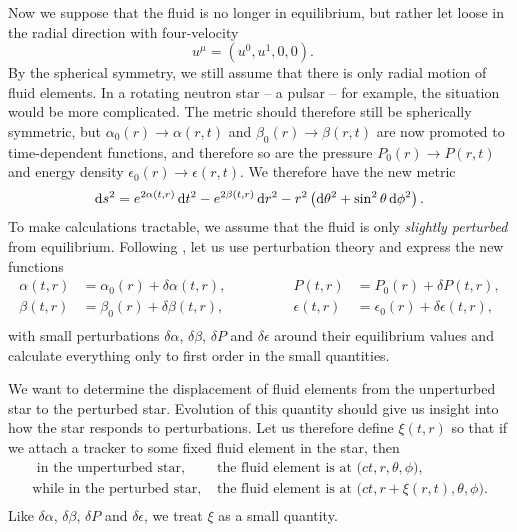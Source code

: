 Now we suppose that the fluid is no longer in equilibrium, but rather let loose in the radial direction with four-velocity
\begin{equation}
	u^\mu = (u^0, u^1, 0, 0) .
	\quad
\label{eq:nstars:velocity_unstable}
\end{equation}
By the spherical symmetry, we still assume that there is only radial motion of fluid elements.
In a rotating neutron star -- a pulsar -- for example, the situation would be more complicated.
The metric should therefore still be spherically symmetric, but $\alpha_0(r) \rightarrow \alpha(r,t)$ and $\beta_0(r) \rightarrow \beta(r,t)$ are now promoted to time-dependent functions, and therefore so are the pressure $P_0(r) \rightarrow P(r,t)$ and energy density $\epsilon_0(r) \rightarrow \epsilon(r,t)$.
We therefore have the new metric
\begin{equation}
	\mathop{}\!\mathrm{d} s^2 = e^{2 \alpha(t, r)} \mathop{}\!\mathrm{d} t^2 - e^{2 \beta(t, r)} \mathop{}\!\mathrm{d} r^2 - r^2 \left( \mathop{}\!\mathrm{d} \theta^2 + \sin^2 \theta \mathop{}\!\mathrm{d} \phi^2 \right) .
\label{eq:nstars:metric_unstable}
\end{equation}
To make calculations tractable, we assume that the fluid is only \emph{slightly perturbed} from equilibrium.
Following \cite{ref:chandrasekhar_stability}, let us use perturbation theory and express the new functions
\begin{equation}
\begin{aligned}
	\alpha   (t, r) &= \alpha_0  (r) + \delta \alpha  (t, r), & \qquad \qquad
	P        (t, r) &= P_0       (r) + \delta P       (t, r), \\
	\beta    (t, r) &= \beta_0   (r) + \delta \beta   (t, r), & \qquad \qquad
	\epsilon (t, r) &= \epsilon_0(r) + \delta \epsilon(t, r), \\
\end{aligned}
\label{eq:nstars:perturbation_expansion}
\end{equation}
with small perturbations $\delta \alpha$, $\delta \beta$, $\delta P$ and $\delta \epsilon$ around their equilibrium values and calculate everything only to first order in the small quantities.

We want to determine the displacement of fluid elements from the unperturbed star to the perturbed star.
Evolution of this quantity should give us insight into how the star responds to perturbations.
Let us therefore define $\xi(t, r)$ so that if we attach a tracker to some fixed fluid element in the star, then
\begin{equation}
\begin{split}
	\text{      in the unperturbed star, } & \text{the fluid element is at $\big(ct,r,\theta,\phi\big)$,} \\
	\text{while in the   perturbed star, } & \text{the fluid element is at $\big(ct,r+\xi(r,t),\theta,\phi\big)$.} \\
\end{split}
\end{equation}
Like $\delta \alpha$, $\delta \beta$, $\delta P$ and $\delta \epsilon$, we treat $\xi$ as a small quantity.

